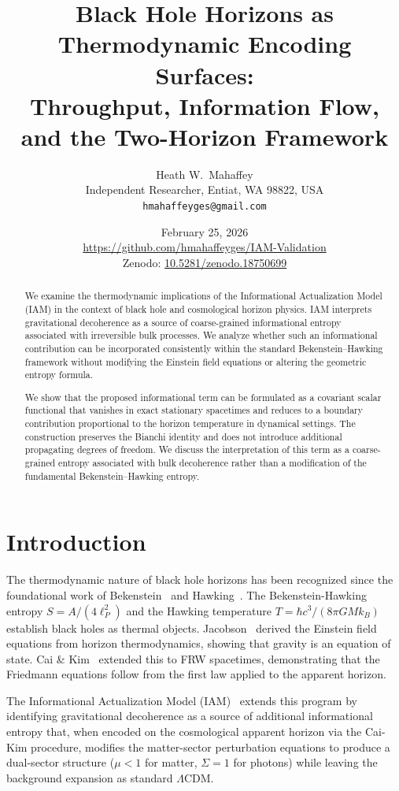 \documentclass[12pt,a4paper]{article}
\title{Black Hole Horizons as Thermodynamic Encoding Surfaces:\\
Throughput, Information Flow, and the Two-Horizon Framework}
\author{Heath W.\ Mahaffey\\
\small Independent Researcher, Entiat, WA 98822, USA\\
\small \texttt{hmahaffeyges@gmail.com}}
\date{February 25, 2026\\
\small \url{https://github.com/hmahaffeyges/IAM-Validation}\\
\small Zenodo: \href{https://doi.org/10.5281/zenodo.18750699}{10.5281/zenodo.18750699}}
\begin{document}
\maketitle


\begin{abstract}
We examine the thermodynamic implications of the Informational Actualization
Model (IAM) in the context of black hole and cosmological horizon physics.
IAM interprets gravitational decoherence as a source of coarse-grained
informational entropy associated with irreversible bulk processes.
We analyze whether such an informational contribution can be incorporated
consistently within the standard Bekenstein--Hawking framework without
modifying the Einstein field equations or altering the geometric entropy
formula.

We show that the proposed informational term can be formulated as a
covariant scalar functional that vanishes in exact stationary spacetimes
and reduces to a boundary contribution proportional to the horizon
temperature in dynamical settings. The construction preserves the
Bianchi identity and does not introduce additional propagating degrees
of freedom. We discuss the interpretation of this term as a coarse-grained
entropy associated with bulk decoherence rather than a modification of
the fundamental Bekenstein--Hawking entropy.
\end{abstract}


\section{Introduction}

The thermodynamic nature of black hole horizons has been recognized since the
foundational work of Bekenstein~\citep{Bekenstein1973} and Hawking~\citep{Hawking1975}.
The Bekenstein-Hawking entropy $S = A/(4\ell_P^2)$ and the Hawking temperature
$T = \hbar c^3/(8\pi G M k_B)$ establish black holes as thermal objects.
Jacobson~\citep{Jacobson1995} derived the Einstein field equations from horizon
thermodynamics, showing that gravity is an equation of state. Cai \&
Kim~\citep{CaiKim2005} extended this to FRW spacetimes, demonstrating that the
Friedmann equations follow from the first law applied to the apparent horizon.

The Informational Actualization Model (IAM)~\citep{Mahaffey2026a,Mahaffey2026b}
extends this program by identifying gravitational decoherence as a source of
additional informational entropy that, when encoded on the cosmological apparent
horizon via the Cai-Kim procedure, modifies the matter-sector perturbation
equations to produce a dual-sector structure ($\mu < 1$ for matter, $\Sigma = 1$
for photons) while leaving the background expansion as standard $\Lambda$CDM.
\end{document}
